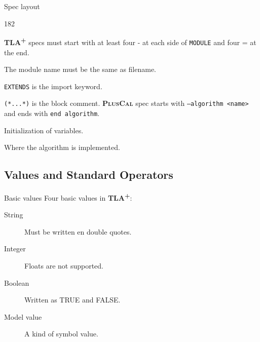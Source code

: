 \documentclass[10pt]{beamer}
\newcommand{\tlaplus}{\textbf{\textsc{TLA\textsuperscript{+}}}\xspace}
\newcommand{\pluscal}{\textbf{\textsc{PlusCal}}\xspace}
\begin{document}
\begin{frame}{Spec layout}
  \begin{dingautolist}{182}
  \item \tlaplus specs must start with at least four - at each side of \texttt{MODULE} and four = at the end.
  \item The module name must be the same as filename.
  \item \texttt{EXTENDS} is the import keyword.
  \item \texttt{(*...*)} is the block comment. \pluscal spec starts with \texttt{--algorithm <name>} and ends with \texttt{end algorithm}.
  \item Initialization of variables.
    \item Where the algorithm is implemented.
  \end{dingautolist}
\end{frame}

\subsection{Values and Standard Operators}

\begin{frame}{Basic values}
  Four basic values in \tlaplus:
  \begin{description}
    \item[String] Must be written en double quotes.
    \item[Integer] Floats are not supported.
    \item[Boolean] Written as TRUE and FALSE.
    \item[Model value] A kind of symbol value.
  \end{description}
\end{frame}
\end{document}
